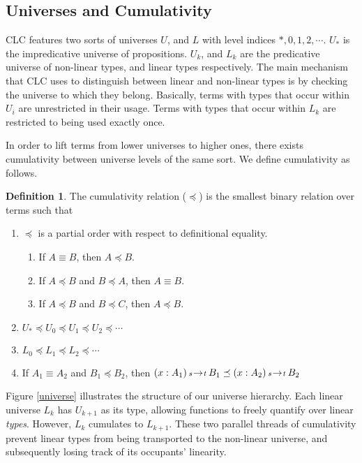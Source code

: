 \documentclass{article}
\theoremstyle{definition}
\newtheorem{definition}{Definition}[section]
\newcommand{\arw}[2]
{\hspace*{0.2em}{\scriptstyle #1}\hspace*{-0.2em}
\rightarrow
\hspace*{-0.2em}{\scriptstyle #2}\hspace*{0.2em}}
\begin{document}
  \subsection{Universes and Cumulativity}
  CLC features two sorts of universes $U$, and $L$ with level indices $*, 0, 1, 2, \cdots$. $U_*$ is the impredicative universe of propositions. $U_k$, and $L_k$ are the predicative universe of non-linear types, and linear types respectively. The main mechanism that CLC uses to distinguish between linear and non-linear types is by checking the universe to which they belong. Basically, terms with types that occur within $U_i$ are unrestricted in their usage. Terms with types that occur within $L_k$ are restricted to being used exactly once.

  In order to lift terms from lower universes to higher ones, there exists cumulativity between universe levels of the same sort. We define cumulativity as follows.

  \begin{definition}
    The cumulativity relation ($\preceq$) is the smallest binary relation over terms such that
    \begin{enumerate}
      \item $\preceq$ is a partial order with respect to definitional equality.
        \begin{enumerate}
          \item If $A \equiv B$, then $A \preceq B$.
          \item If $A \preceq B$ and $B \preceq A$, then $A \equiv B$.
          \item If $A \preceq B$ and $B \preceq C$, then $A \preceq B$.
        \end{enumerate}
      \item $U_* \preceq U_0 \preceq U_1 \preceq U_2 \preceq \cdots$
      \item $L_0 \preceq L_1 \preceq L_2 \preceq \cdots$
      \item If $A_1 \equiv A_2$ and $B_1 \preceq B_2$, then
        $(x : A_1) \arw{s}{t} B_1 \preceq (x : A_2) \arw{s}{t} B_2$
    \end{enumerate}
  \end{definition}

  Figure \ref{universe} illustrates the structure of our universe hierarchy. Each linear universe $L_k$ has $U_{k+1}$ as its type, allowing functions to freely quantify over linear \textit{types}. However, $L_k$ cumulates to $L_{k+1}$. These two parallel threads of cumulativity prevent linear types from being transported to the non-linear universe, and subsequently losing track of its occupants' linearity.
\end{document}
